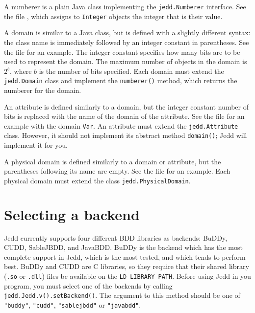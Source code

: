 \documentclass{article}
\begin{document}
A numberer is a plain Java class implementing the {\tt jedd.Numberer}
interface. See the file ,
which assigns to {\tt Integer} objects the integer that is their value.

A domain is similar to a Java class, but is defined with a
slightly different syntax: the class name is immediately followed
by an integer constant in parentheses. See the file 
 for an example.
The integer constant specifies how many bits are to be used to represent
the domain. The maximum number of objects in the domain is $2^b$, where $b$
is the number of bits specified. Each domain must extend the {\tt jedd.Domain}
class and implement the {\tt numberer()} method, which returns the
numberer for the domain.

An attribute is defined similarly to a domain, but the integer constant
number of bits is replaced with the name of the domain of the attribute.
See the file  for an
example with the domain {\tt Var}. An attribute must extend the 
{\tt jedd.Attribute} class. However, it should not implement its
abstract method {\tt domain()}; Jedd will implement it for you.

A physical domain is defined similarly to a domain or attribute, but
the parentheses following its name are empty. See the file 
 for an example.
Each physical domain must extend the class {\tt jedd.PhysicalDomain}.

\section{Selecting a backend}
Jedd currently supports four different BDD libraries as backends:
BuDDy, CUDD, SableJBDD, and JavaBDD. BuDDy is the backend which has
the most complete support in Jedd, which is the most tested, and which
tends to perform best. BuDDy and CUDD are C libraries, so they require
that their shared library ({\tt .so} or {\tt .dll}) files be available
on the {\tt LD\_LIBRARY\_PATH}. Before using Jedd in you program,
you must select one of the backends by calling
{\tt jedd.Jedd.v().setBackend()}. The argument to this method
should be one of {\tt "buddy"}, {\tt "cudd"}, {\tt "sablejbdd"} or
{\tt "javabdd"}.
\end{document}

